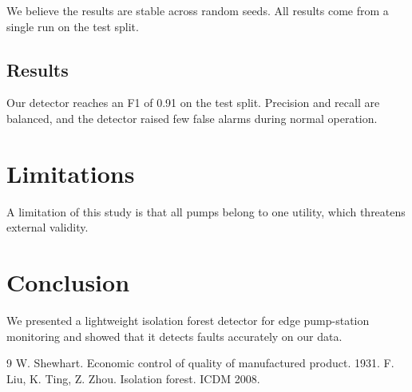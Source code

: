 \documentclass{article}
\begin{document}
We believe the results are stable across random seeds. All results come from a single run on the test split.

\subsection{Results}
Our detector reaches an F1 of 0.91 on the test split. Precision and recall are balanced, and the detector raised few false alarms during normal operation.

\section{Limitations}
A limitation of this study is that all pumps belong to one utility, which threatens external validity.

\section{Conclusion}
We presented a lightweight isolation forest detector for edge pump-station monitoring and showed that it detects faults accurately on our data.

\begin{thebibliography}{9}
 W. Shewhart. Economic control of quality of manufactured product. 1931.
 F. Liu, K. Ting, Z. Zhou. Isolation forest. ICDM 2008.
\end{thebibliography}
\end{document}
